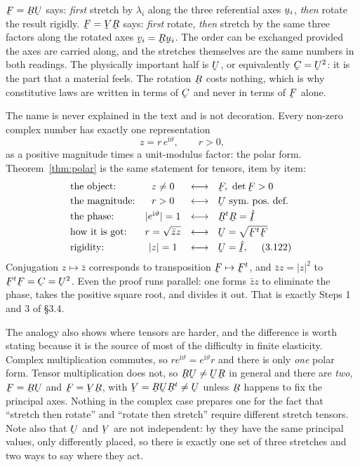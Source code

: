 \begin{remark}\label{rem:polarwords}
$\bF=\bR\bU$ says: \emph{first} stretch by $\lambda_{i}$ along the three
referential axes $\bu_{i}$, \emph{then} rotate the result rigidly.
$\bF=\bV\bR$ says: \emph{first} rotate, \emph{then} stretch by the same
three factors along the rotated axes $\bv_{i}=\bR\bu_{i}$. The order can
be exchanged provided the axes are carried along, and the stretches
themselves are the same numbers in both readings. The physically important
half is $\bU$, or equivalently $\bC=\bU^{2}$: it is the part that a
material feels. The rotation $\bR$ costs nothing, which is why
constitutive laws are written in terms of $\bC$ and never in terms of
$\bF$ alone.
\end{remark}

\begin{remark}\label{rem:whypolar}
The name is never explained in the text and is not decoration. Every
non-zero complex number has exactly one representation
\[
   z=r\,e^{\mathrm{i}\vartheta},\qquad r>0,
\]
as a positive magnitude times a unit-modulus factor: the polar form.
Theorem~\ref{thm:polar} is the same statement for tensors, item by item:
\[
\begin{array}{lcl}
   \text{the object:}& z\neq0
     &\longleftrightarrow\ \ \bF,\ \det\bF>0\\[1mm]
   \text{the magnitude:}& r>0
     &\longleftrightarrow\ \ \bU\ \text{sym.\ pos.\ def.}\\[1mm]
   \text{the phase:}& |e^{\mathrm{i}\vartheta}|=1
     &\longleftrightarrow\ \ \bR^{t}\bR=\hI\\[1mm]
   \text{how it is got:}& r=\sqrt{\bar z z}
     &\longleftrightarrow\ \ \bU=\sqrt{\bF^{t}\bF}\\[1mm]
   \text{rigidity:}& |z|=1
     &\longleftrightarrow\ \ \bU=\hI,\ \ \eqr{3.122}
\end{array}
\]
Conjugation $z\mapsto\bar z$ corresponds to transposition
$\bF\mapsto\bF^{t}$, and $\bar zz=|z|^{2}$ to $\bF^{t}\bF=\bC=\bU^{2}$.
Even the proof runs parallel: one forms $\bar zz$ to eliminate the phase,
takes the positive square root, and divides it out. That is exactly Steps
1 and 3 of \S3.4.

The analogy also shows where tensors are harder, and the difference is
worth stating because it is the source of most of the difficulty in finite
elasticity. Complex multiplication commutes, so $re^{\mathrm{i}\vartheta}
=e^{\mathrm{i}\vartheta}r$ and there is only \emph{one} polar form. Tensor
multiplication does not, so $\bR\bU\neq\bU\bR$ in general and there are
\emph{two}, $\bF=\bR\bU$ and $\bF=\bV\bR$, with $\bV=\bR\bU\bR^{t}\neq\bU$
unless $\bR$ happens to fix the principal axes. Nothing in the complex case
prepares one for the fact that ``stretch then rotate'' and ``rotate then
stretch'' require different stretch tensors. Note also that $\bU$ and $\bV$
are not independent: by  they have the same principal values, only
differently placed, so there is exactly one set of three stretches and two
ways to say where they act.
\end{remark}

